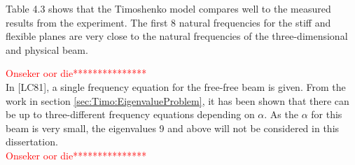 \documentclass[../../main.tex]{subfiles}
\begin{document}
\FloatBarrier

Table 4.3 shows that the Timoshenko model compares well to the measured results from the experiment. The first 8 natural frequencies for the stiff and flexible planes are very close to the natural frequencies of the three-dimensional and physical beam.

\textcolor{red}{Onseker oor die***************}\\
In [LC81], a single frequency equation for the free-free beam is given. From the work in section \ref{sec:Timo:EigenvalueProblem}, it has been shown that there can be up to three-different frequency equations depending on $\alpha$. As the $\alpha$ for this beam is very small, the eigenvalues 9 and above will not be considered in this dissertation.\\
\textcolor{red}{Onseker oor die***************}
\end{document}
